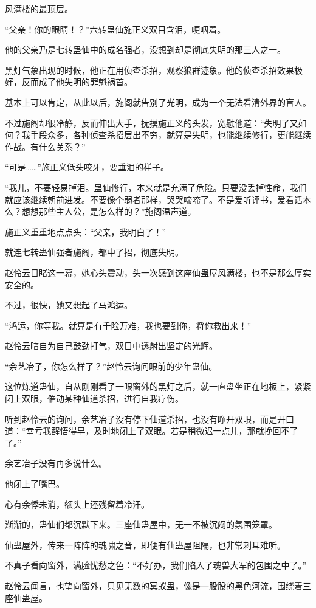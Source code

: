 \begin{this_body}
风满楼的最顶层。

“父亲！你的眼睛！？”六转蛊仙施正义双目含泪，哽咽着。

他的父亲乃是七转蛊仙中的成名强者，没想到却是彻底失明的那三人之一。

黑灯气象出现的时候，他正在用侦查杀招，观察狼群迹象。他的侦查杀招效果极好，反而成了他失明的罪魁祸首。

基本上可以肯定，从此以后，施阁就告别了光明，成为一个无法看清外界的盲人。

不过施阁却很冷静，反而伸出大手，抚摸施正义的头发，宽慰他道：“失明了又如何？我手段众多，各种侦查杀招层出不穷，就算是失明，也能继续修行，更能继续作战。有什么关系？”

“可是……”施正义低头咬牙，要垂泪的样子。

“我儿，不要轻易掉泪。蛊仙修行，本来就是充满了危险。只要没丢掉性命，我们就应该继续朝前进发。不要像个弱者那样，哭哭啼啼了。不是爱听评书，爱看话本么？想想那些主人公，是怎么样的？”施阁温声道。

施正义重重地点点头：“父亲，我明白了！”

就连七转蛊仙强者施阁，都中了招，彻底失明。

赵怜云目睹这一幕，她心头震动，头一次感到这座仙蛊屋风满楼，也不是那么厚实安全的。

不过，很快，她又想起了马鸿运。

“鸿运，你等我。就算是有千险万难，我也要到你，将你救出来！”

赵怜云暗自为自己鼓劲打气，双目中透射出坚定的光辉。

“余艺冶子，你怎么样了？”赵怜云询问眼前的少年蛊仙。

这位炼道蛊仙，自从刚刚看了一眼窗外的黑灯之后，就一直盘坐正在地板上，紧紧闭上双眼，催动某种仙道杀招，进行自我疗伤。

听到赵怜云的询问，余艺冶子没有停下仙道杀招，也没有睁开双眼，而是开口道：“幸亏我醒悟得早，及时地闭上了双眼。若是稍微迟一点儿，那就挽回不了了。”

余艺冶子没有再多说什么。

他闭上了嘴巴。

心有余悸未消，额头上还残留着冷汗。

渐渐的，蛊仙们都沉默下来。三座仙蛊屋中，无一不被沉闷的氛围笼罩。

仙蛊屋外，传来一阵阵的魂啸之音，即便有仙蛊屋阻隔，也非常刺耳难听。

不真子看向窗外，满脸忧愁之色：“不好办，我们陷入了魂兽大军的包围之中了。”

赵怜云闻言，也望向窗外，只见无数的冥蚁蛊，像是一股股的黑色河流，围绕着三座仙蛊屋。

\end{this_body}


